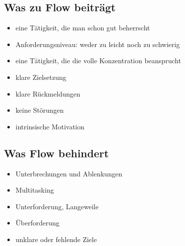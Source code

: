 \subsection{Was zu Flow beiträgt}

\begin{itemize}
    \item eine Tätigkeit, die man schon gut beherrscht
    \item Anforderungsniveau: weder zu leicht noch zu schwierig
    \item eine Tätigkeit, die die volle Konzentration beansprucht
    \item klare Zielsetzung
    \item klare Rückmeldungen
    \item keine Störungen
    \item intrinsische Motivation
\end{itemize}

\subsection{Was Flow behindert}

\begin{itemize}
    \item Unterbrechungen und Ablenkungen
    \item Multitasking
    \item Unterforderung, Langeweile
    \item Überforderung
    \item unklare oder fehlende Ziele
\end{itemize}
